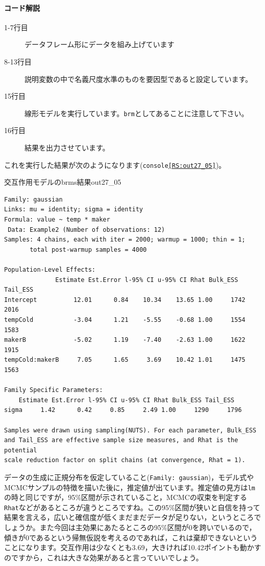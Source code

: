 \documentclass{ltjsarticle}
\begin{document}
\paragraph{コード解説}
\begin{description}
	\item[1-7行目] データフレーム形にデータを組み上げています
	\item[8-13行目] 説明変数の中で名義尺度水準のものを要因型であると設定しています。
	\item[15行目] 線形モデルを実行しています。\texttt{brm}としてあることに注意して下さい。
	\item[16行目] 結果を出力させています。
\end{description}
これを実行した結果が次のようになります(\texttt{console\ref{RS:out27_05}})。
\begin{Rscreen}{交互作用モデルのbrms結果}{out27_05}
	\begin{verbatim}
Family: gaussian 
Links: mu = identity; sigma = identity 
Formula: value ~ temp * maker 
 Data: Example2 (Number of observations: 12) 
Samples: 4 chains, each with iter = 2000; warmup = 1000; thin = 1;
       total post-warmup samples = 4000

Population-Level Effects: 
              Estimate Est.Error l-95% CI u-95% CI Rhat Bulk_ESS Tail_ESS
Intercept          12.01      0.84    10.34    13.65 1.00     1742     2016
tempCold           -3.04      1.21    -5.55    -0.68 1.00     1554     1583
makerB             -5.02      1.19    -7.40    -2.63 1.00     1622     1915
tempCold:makerB     7.05      1.65     3.69    10.42 1.01     1475     1563

Family Specific Parameters: 
    Estimate Est.Error l-95% CI u-95% CI Rhat Bulk_ESS Tail_ESS
sigma     1.42      0.42     0.85     2.49 1.00     1290     1796

Samples were drawn using sampling(NUTS). For each parameter, Bulk_ESS
and Tail_ESS are effective sample size measures, and Rhat is the potential
scale reduction factor on split chains (at convergence, Rhat = 1).
\end{verbatim}
\end{Rscreen}
データの生成に正規分布を仮定していること(\texttt{Family: gaussian})，モデル式やMCMCサンプルの特徴を描いた後に，推定値が出ています。推定値の見方は\texttt{lm}の時と同じですが，95\%区間が示されていること，MCMCの収束を判定する\texttt{Rhat}などがあるところが違うところですね。この95\%区間が狭いと自信を持って結果を言える，広いと確信度が低くまだまだデータが足りない，というところでしょうか。また今回は主効果にあたるところの95\%区間が0を跨いでいるので，傾きが0であるという帰無仮説を考えるのであれば，これは棄却できないということになります。交互作用は少なくとも3.69，大きければ10.42ポイントも動かすのですから，これは大きな効果があると言っていいでしょう。
\end{document}

